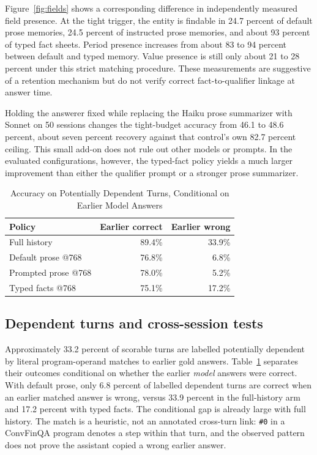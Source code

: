 \documentclass[conference,a4paper]{IEEEtran}
\begin{document}
Figure~\ref{fig:fields} shows a corresponding difference in independently measured field presence. At the tight trigger, the entity is findable in 24.7 percent of default prose memories, 24.5 percent of instructed prose memories, and about 93 percent of typed fact sheets. Period presence increases from about 83 to 94 percent between default and typed memory. Value presence is still only about 21 to 28 percent under this strict matching procedure. These measurements are suggestive of a retention mechanism but do not verify correct fact-to-qualifier linkage at answer time.

Holding the answerer fixed while replacing the Haiku prose summarizer with Sonnet on 50 sessions changes the tight-budget accuracy from 46.1 to 48.6 percent, about seven percent recovery against that control's own 82.7 percent ceiling. This small add-on does not rule out other models or prompts. In the evaluated configurations, however, the typed-fact policy yields a much larger improvement than either the qualifier prompt or a stronger prose summarizer.

\begin{table}[t]
\caption{Accuracy on Potentially Dependent Turns, Conditional on Earlier Model Answers}
\label{tab:dependent}
\centering
\begin{tabular}{lrr}
\toprule
Policy & Earlier correct & Earlier wrong \\
\midrule
Full history & 89.4\% & 33.9\% \\
Default prose @768 & 76.8\% & 6.8\% \\
Prompted prose @768 & 78.0\% & 5.2\% \\
Typed facts @768 & 75.1\% & 17.2\% \\
\bottomrule
\end{tabular}
\end{table}

\subsection{Dependent turns and cross-session tests}

Approximately 33.2 percent of scorable turns are labelled potentially dependent by literal program-operand matches to earlier gold answers. Table~\ref{tab:dependent} separates their outcomes conditional on whether the earlier \emph{model} answers were correct. With default prose, only 6.8 percent of labelled dependent turns are correct when an earlier matched answer is wrong, versus 33.9 percent in the full-history arm and 17.2 percent with typed facts. The conditional gap is already large with full history. The match is a heuristic, not an annotated cross-turn link: \texttt{\#0} in a ConvFinQA program denotes a step within that turn, and the observed pattern does not prove the assistant copied a wrong earlier answer.
\end{document}
